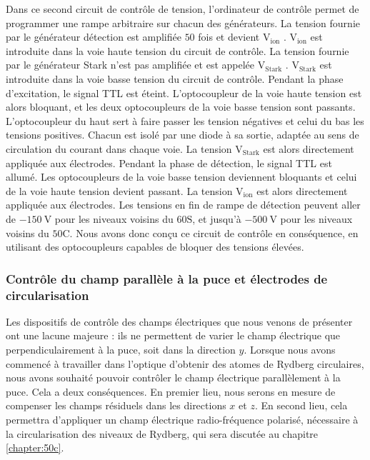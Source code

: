 Dans ce second circuit de contrôle de tension, l'ordinateur de contrôle permet de programmer une rampe arbitraire sur chacun des générateurs.
La tension fournie par le générateur \og détection \fg{} est amplifiée $\num{50}$ fois et devient \og $\mathrm{V_{ion}}$ \fg{}.
$\mathrm{V_{ion}}$ est introduite dans la voie haute tension du circuit de contrôle.
La tension fournie par le générateur \og Stark \fg{} n'est pas amplifiée et est appelée \og $\mathrm{V_{Stark}}$ \fg{}.
$\mathrm{V_{Stark}}$ est introduite dans la voie basse tension du circuit de contrôle.
Pendant la phase d'excitation, le signal TTL est éteint. L'optocoupleur de la voie haute tension est alors bloquant, et les deux optocoupleurs de la voie basse tension sont passants.
L'optocoupleur du haut sert à faire passer les tension négatives et celui du bas les tensions positives.
Chacun est isolé par une diode à sa sortie, adaptée au sens de circulation du courant dans chaque voie.
La tension $\mathrm{V_{Stark}}$ est alors directement appliquée aux électrodes.
Pendant la phase de détection, le signal TTL est allumé. Les optocoupleurs de la voie basse tension deviennent bloquants et celui de la voie haute tension devient passant.
La tension $\mathrm{V_{ion}}$ est alors directement appliquée aux électrodes.
Les tensions en fin de rampe de détection peuvent aller de $\SI{-150}{\V}$ pour les niveaux voisins du $\mathrm{60S}$, et jusqu'à $\SI{-500}{\V}$ pour les niveaux voisins du $\mathrm{50C}$.
Nous avons donc conçu ce circuit de contrôle en conséquence, en utilisant des optocoupleurs capables de bloquer des tensions élevées.
	
 \subsubsection*{Contrôle du champ parallèle à la puce et électrodes de circularisation}
\noindent Les dispositifs de contrôle des champs électriques que nous venons de présenter ont une lacune majeure :
ils ne permettent de varier le champ électrique que perpendiculairement à la puce, soit dans la direction $y$.
Lorsque nous avons commencé à travailler dans l'optique d'obtenir des atomes de Rydberg circulaires, nous avons souhaité pouvoir contrôler le champ électrique parallèlement à la puce.
Cela a deux conséquences.
En premier lieu, nous serons en mesure de compenser les champs résiduels dans les directions $x$ et $z$.
En second lieu, cela permettra d'appliquer un champ électrique radio-fréquence polarisé, nécessaire à la circularisation des niveaux de Rydberg, qui sera discutée au chapitre \ref{chapter:50c}.


